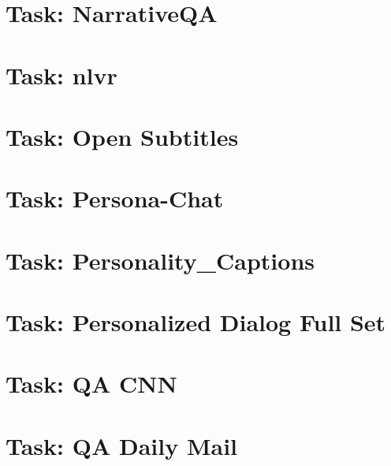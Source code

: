 \documentclass[twoside]{book}
\newcommand{\+}{\discretionary{\mbox{\scriptsize$\hookleftarrow$}}{}{}}
\begin{document}
\chapter{Task\+: Narrative\+QA}
\label{md_parlai_tasks_narrative_qa_README}

\chapter{Task\+: nlvr}
\label{md_parlai_tasks_nlvr_README}

\chapter{Task\+: Open Subtitles}
\label{md_parlai_tasks_opensubtitles_README}

\chapter{Task\+: Persona-\/\+Chat}
\label{md_parlai_tasks_personachat_README}

\chapter{Task\+: Personality\+\_\+\+Captions}
\label{md_parlai_tasks_personality_captions_README}

\chapter{Task\+: Personalized Dialog Full Set}
\label{md_parlai_tasks_personalized_dialog_README}

\chapter{Task\+: QA C\+NN}
\label{md_parlai_tasks_qacnn_README}

\chapter{Task\+: QA Daily Mail}
\label{md_parlai_tasks_qadailymail_README}

\end{document}
